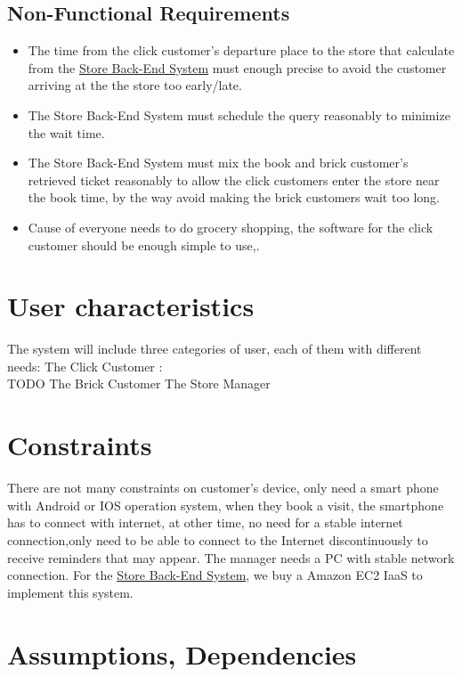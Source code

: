 \documentclass[a4paper,12pt]{book}
\begin{document}
\subsection{Non-Functional Requirements}
\begin{itemize}
	\item The time from the click customer's departure place to the store that calculate from the \hyperref[Definitions]{Store Back-End System} must enough precise to avoid the customer arriving at the the store too early/late.
	\item The Store Back-End System must schedule the query reasonably to minimize the wait time.
	\item The Store Back-End System must mix the book and brick customer's retrieved ticket reasonably to allow the click customers enter the store near the book time, by the way avoid making the brick customers wait too long.
	\item Cause of everyone needs to do grocery shopping, the software for the click customer should be enough simple to use,.
\end{itemize}

\section{User characteristics}
The system will include three categories of user, each of them with different needs:
The Click Customer : \\TODO
The Brick Customer
The Store Manager



\section{Constraints}
There are not many constraints on customer's device, only need a smart phone with Android or IOS operation system, when they book a visit, the smartphone has to connect with internet, at other time, no need for a stable internet connection,only need to be able to connect to the Internet discontinuously to receive reminders that may appear.
The manager needs a PC with stable network connection.
For the \hyperref[Definitions]{Store Back-End System}, we buy a Amazon EC2 IaaS to implement this system.


\section{Assumptions, Dependencies}
\end{document}
